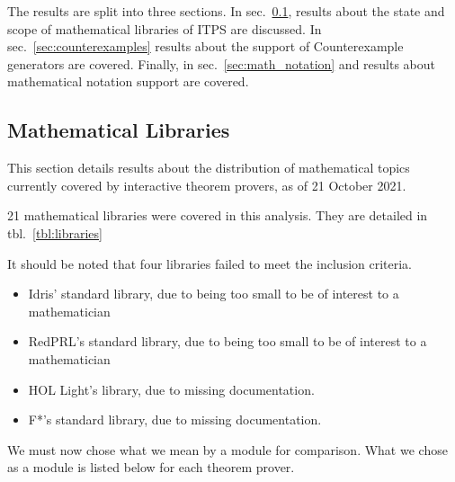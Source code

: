 \documentclass[
]{article}
\providecommand{\tightlist}{%
  \setlength{\itemsep}{0pt}\setlength{\parskip}{0pt}}
\begin{document}
The results are split into three sections. In
sec.~\ref{sec:math_libraries}, results about the state and scope of
mathematical libraries of ITPS are discussed. In
sec.~\ref{sec:counterexamples} results about the support of
Counterexample generators are covered. Finally, in
sec.~\ref{sec:math_notation} and results about mathematical notation
support are covered.

\hypertarget{sec:math_libraries}{%
\subsection{Mathematical Libraries}\label{sec:math_libraries}}

This section details results about the distribution of mathematical
topics currently covered by interactive theorem provers, as of 21
October 2021.

21 mathematical libraries were covered in this analysis. They are
detailed in tbl.~\ref{tbl:libraries}

It should be noted that four libraries failed to meet the inclusion
criteria.

\begin{itemize}
\tightlist
\item
  Idris' standard library, due to being too small to be of interest to a
  mathematician
\item
  RedPRL's standard library, due to being too small to be of interest to
  a mathematician
\item
  HOL Light's library, due to missing documentation.
\item
  F*'s standard library, due to missing documentation.
\end{itemize}

We must now chose what we mean by a module for comparison. What we chose
as a module is listed below for each theorem prover.
\end{document}
